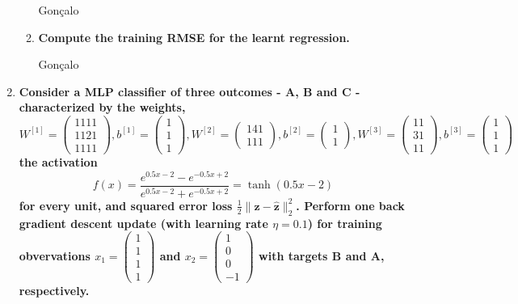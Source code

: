 \documentclass[12pt]{article}
\begin{document}
\begin{enumerate}[leftmargin=\labelsep]
\begin{enumerate}
              \vskip 0.3cm
              Gonçalo

        \item \textbf{Compute the training RMSE for the learnt regression.}

              \vskip 0.3cm
              Gonçalo
    \end{enumerate}

    \item \textbf{Consider a MLP classifier of three outcomes - A, B and C - characterized by the weights,} \\

          \vskip -0.2cm
          $W^{[1]} = \begin{pmatrix} 1 1 1 1 \\ 1 1 2 1 \\ 1 1 1 1\end{pmatrix}, b^{[1]} = \begin{pmatrix} 1 \\ 1 \\ 1 \end{pmatrix},
          W^{[2]} = \begin{pmatrix} 1 4 1 \\ 1 1 1 \end{pmatrix}, b^{[2]} = \begin{pmatrix} 1 \\ 1 \end{pmatrix},
          W^{[3]} = \begin{pmatrix} 1 1 \\ 3 1 \\ 1 1\end{pmatrix}, b^{[3]} = \begin{pmatrix} 1 \\ 1 \\ 1 \end{pmatrix}$ \\

          \textbf{the activation \[ f(x) = \frac{{e^{0.5x - 2} - e^{-0.5x + 2}}}{{e^{0.5x - 2} + e^{-0.5x + 2}}} = \tanh(0.5x - 2) \] for every unit, and squared error
          loss $\frac{1}{2} \|\mathbf{z} - \hat{\mathbf{z}}\|^{2}_{2}$. Perform one back gradient descent update (with learning rate $\eta = 0.1$) for training
          obvervations $x_1 = \begin{pmatrix} 1 \\ 1 \\ 1 \\ 1 \end{pmatrix}$ and $x_2 = \begin{pmatrix} 1 \\ 0 \\ 0 \\ -1 \end{pmatrix}$ with targets B and A,
          respectively.}


\end{enumerate}
\end{document}
